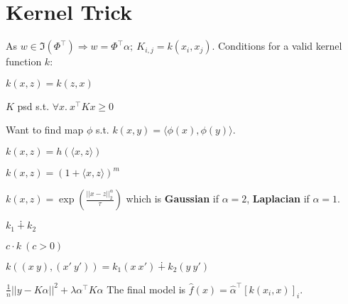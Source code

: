 \section{Kernel Trick}
As \(w \in \Im(\Phi^\top) \Rightarrow w = \Phi^\top \alpha; \ K_{i, j} = k(x_i, x_j)\).
Conditions for a valid kernel function \(k\): \\
\begin{itemize*}
  \item \(k(x, z) = k(z, x)\)
  \item \(K\) psd s.t. \(\forall x. \ x^\top K x \geq 0 \) \\
\end{itemize*}
Want to find map \(\phi\) s.t. \(k(x, y) = \langle\phi(x), \phi(y)\rangle\).

\begin{definition}
  \(k(x, z) = h(\langle x, z \rangle)\)
\end{definition}

\begin{definition}
  \(k(x, z) = (1 + \langle x, z \rangle)^m\)
\end{definition}

\begin{definition}
  \(k(x, z)  = \exp\left(\frac{||x - z||_2^\alpha}{\tau}\right)\) which is \textbf{Gaussian} if \(\alpha = 2\), \textbf{Laplacian} if \(\alpha = 1\).
\end{definition}

\begin{definition}
  \begin{itemize*}
    \item \(k_1 \dotplus k_2\)
    \item \(c\cdot k \ (c >0)\)
    \item \(k((x \ y), (x' \ y')) = k_1(x \ x') \dotplus k_2(y \ y') \)
  \end{itemize*}
\end{definition}

\begin{definition}
  \(\frac{1}{n}||y - K\alpha||^2 + \lambda \alpha^\top K \alpha\)
  The final model is \(\hat{f}(x) = \hat{\alpha}^\top [k(x_i, x)]_i\).
\end{definition}